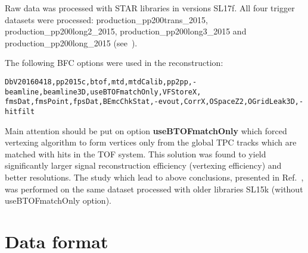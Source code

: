 Raw data was processed with STAR libraries in versions SL17f. All four trigger datasets were processed: production\_pp200trans\_2015, production\_pp200long2\_2015, production\_pp200long3\_2015 and production\_pp200long\_2015 (see~\cite{ProductionList}).

The following BFC options were used in the reconstruction:\vspace{-5pt}
\begin{verbatim}
DbV20160418,pp2015c,btof,mtd,mtdCalib,pp2pp,-beamline,beamline3D,useBTOFmatchOnly,VFStoreX,
fmsDat,fmsPoint,fpsDat,BEmcChkStat,-evout,CorrX,OSpaceZ2,OGridLeak3D,-hitfilt
\end{verbatim}
Main attention should be put on option \textbf{useBTOFmatchOnly} which forced vertexing algorithm to form vertices only from the global TPC tracks which are matched with hits in the TOF system. This solution was found to yield significantly larger signal reconstruction efficiency (vertexing efficiency) and better resolutions. The study which lead to above conclusions, presented in Ref.~\cite{RevertexingProposal}, was performed on the same dataset processed with older libraries SL15k (without useBTOFmatchOnly option).



\section{Data format}\label{sec:dataFormat}

